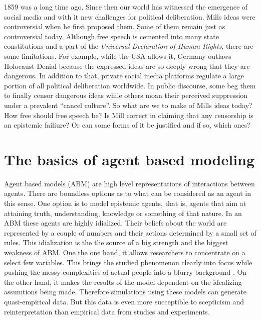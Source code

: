 \documentclass{essay-formal}
\begin{document}
1859 was a long time ago. Since then our world has witnessed the emergence of social media and with it new challenges for political deliberation. Mills ideas were controversial when he first proposed them. Some of them remain just as controversial today. Although free speech is cemented into many state constitutions and a part of the \emph{Universal Declaration of Human Rights}, there are some limitations. For example, while the USA allows it, Germany outlaws Holocaust Denial because the expressed ideas are so deeply wrong that they are dangerous. In addition to that, private social media platforms regulate a large portion of all political deliberation worldwide. In public discourse, some beg them to finally censor dangerous ideas while others moan their perceived suppression under a prevalent \enquote{cancel culture}. So what are we to make of Mills ideas today? How free should free speech be? Is Mill correct in claiming that any censorship is an epistemic failiure? Or can some forms of it be justified and if so, which ones?

\section{The basics of agent based modeling}

Agent based models (ABM) are high level representations of interactions between agents. There are boundless options as to what can be considered as an agent in this sense. One option is to model epistemic agents, that is, agents that aim at attaining truth, understanding, knowledge or something of that nature. In an ABM these agents are highly idialized. Their beliefs about the world are represented by a couple of numbers and their actions determined by a small set of rules. This idialization is the the source of a big strength and the biggest weakness of ABM. One the one hand, it allows researchers to concentrate on a select few variables. This brings the studied phenomenon clearly into focus while pushing the messy complexities of actual people into a blurry background \parencite[][highlights this strength]{shugars2021}. On the other hand, it makes the results of the model dependent on the idealizing assumtions being made. Therefore simulations using these models can generate quasi-empirical data. But this data is even more succeptible to scepticism and reinterpretation than empirical data from studies and experiments.
\end{document}
